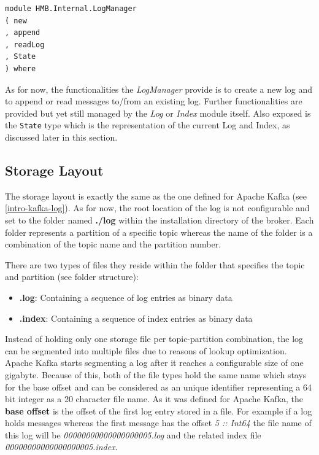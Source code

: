 \begin{lstlisting}
module HMB.Internal.LogManager
( new
, append
, readLog
, State
) where
\end{lstlisting}

As for now, the functionalities the \textit{LogManager} provide is to create a
new log and to append or read messages to/from an existing log. Further
functionalities are provided but yet still managed by the \textit{Log} or
\textit{Index} module itself. Also exposed is the \lstinline{State} type which is
the representation of the current Log and Index, as discussed later in this
section.

\newpage
\subsection{Storage Layout}
\label{log-broker-storage}

The storage layout is exactly the same as the one defined for Apache Kafka (see
\ref{intro-kafka-log}).  As for now, the root location of the log is not
configurable and set to the folder named \textbf{./log} within the installation
directory of the broker. Each folder represents a partition of a specific topic
whereas the name of the folder is a combination of the topic name and the
partition number.

There are two types of files they reside within the folder that specifies the
topic and partition (see folder structure):
\begin{itemize}
    \item {\bf .log}: Containing a sequence of log entries as binary data
    \item{\bf .index}: Containing a sequence of index entries as binary data
\end{itemize}

Instead of holding only one storage file per topic-partition combination, the
log can be segmented into multiple files due to reasons of lookup optimization.
Apache Kafka starts segmenting a log after it reaches a configurable size of one
gigabyte. Because of this, both of the file types hold the same name which stays
for the base offset and can be considered as an unique identifier representing a
64 bit integer as a 20 character file name. As it was defined for Apache Kafka,
the \textbf{base offset} is the offset of the first log entry stored in a file.
For example if a log holds messages whereas the first message has the offset
\textit{5 :: Int64} the file name of this log will be
\textit{00000000000000000005.log} and the related index file
\textit{00000000000000000005.index}.

